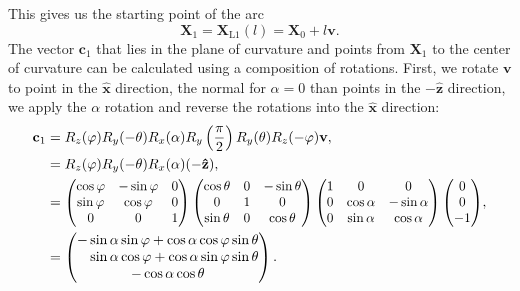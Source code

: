 			This gives us the starting point of the arc
				\begin{equation}
					\mathbf{X}_1 = \mathbf{X}_\text{L1}(l) = \mathbf{X}_0 + l\mathbf{v}.
				\end{equation}
			The vector $\mathbf{c}_1$ that lies in the plane of curvature and points from $\mathbf{X}_1$ to the center of curvature can be calculated using a composition of rotations. First, we rotate $\mathbf{v}$ to point in the $\mathbf{\hat{x}}$ direction, the normal for $\alpha = 0$ than points in the $-\mathbf{\hat{z}}$ direction, we apply the $\alpha$ rotation and reverse the rotations into the $\mathbf{\hat{x}}$ direction:
				\begin{equation}
					\begin{aligned}
						\mathbf{c}_1 &= R_z(\varphi)R_y(-\theta)R_x(\alpha)R_y\left(\frac{\pi}{2}\right)R_y(\theta)R_z(-\varphi)\mathbf{v},\\
						&= R_z(\varphi)R_y(-\theta)R_x(\alpha)(-\mathbf{\hat{z}}),\\
						&= \scalebox{0.95}{$
								\begin{pmatrix}
									\cos\varphi & -\sin\varphi & 0\\
									\sin\varphi & \cos\varphi & 0\\
									0 & 0 & 1
								\end{pmatrix}
								\begin{pmatrix}
									\cos\theta & 0 & -\sin\theta\\
									0 & 1 & 0\\
									\sin\theta & 0 & \cos\theta
								\end{pmatrix}
								\begin{pmatrix}
									1 & 0 & 0\\
									0 & \cos\alpha & -\sin\alpha\\
									0 & \sin\alpha & \cos\alpha
								\end{pmatrix}
								\begin{pmatrix}
									0\\ 0\\ -1
								\end{pmatrix}
							$},\\
						&= 	\begin{pmatrix}
								-\sin\alpha\sin\varphi+\cos\alpha\cos\varphi\sin\theta\\
								\phantom{-}\sin\alpha\cos\varphi+\cos\alpha\sin\varphi\sin\theta\\
								-\cos\alpha\cos\theta
							\end{pmatrix}.
					\end{aligned}
				\end{equation}
